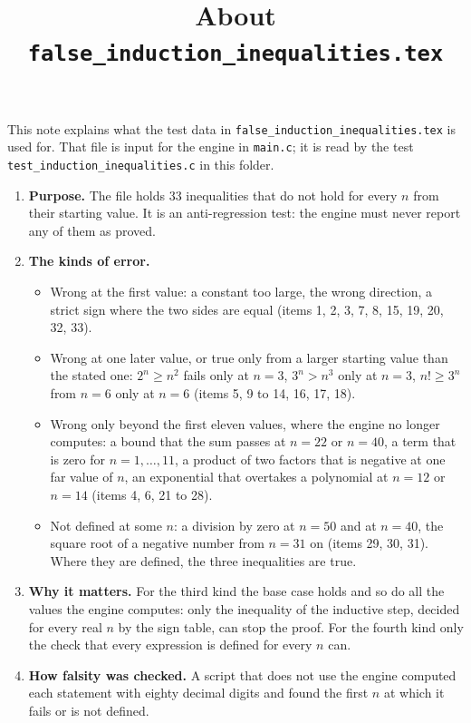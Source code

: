 \documentclass[11pt,a4paper]{article}
\title{About \texttt{false\_induction\_inequalities.tex}}
\author{}
\date{}
\begin{document}
\maketitle
This note explains what the test data in \texttt{false\_induction\_inequalities.tex} is used for. That file is input for the engine in \texttt{main.c}; it is read by the test \texttt{test\_induction\_inequalities.c} in this folder.

\begin{enumerate}
\item \textbf{Purpose.} The file holds 33 inequalities that do not hold for every $n$ from their starting value. It is an anti-regression test: the engine must never report any of them as proved.

\item \textbf{The kinds of error.}
\begin{itemize}
\item Wrong at the first value: a constant too large, the wrong direction, a strict sign where the two sides are equal (items 1, 2, 3, 7, 8, 15, 19, 20, 32, 33).
\item Wrong at one later value, or true only from a larger starting value than the stated one: $2^{n} \ge n^{2}$ fails only at $n = 3$, $3^{n} > n^{3}$ only at $n = 3$, $n! \ge 3^{n}$ from $n = 6$ only at $n = 6$ (items 5, 9 to 14, 16, 17, 18).
\item Wrong only beyond the first eleven values, where the engine no longer computes: a bound that the sum passes at $n = 22$ or $n = 40$, a term that is zero for $n = 1, \ldots, 11$, a product of two factors that is negative at one far value of $n$, an exponential that overtakes a polynomial at $n = 12$ or $n = 14$ (items 4, 6, 21 to 28).
\item Not defined at some $n$: a division by zero at $n = 50$ and at $n = 40$, the square root of a negative number from $n = 31$ on (items 29, 30, 31). Where they are defined, the three inequalities are true.
\end{itemize}

\item \textbf{Why it matters.} For the third kind the base case holds and so do all the values the engine computes: only the inequality of the inductive step, decided for every real $n$ by the sign table, can stop the proof. For the fourth kind only the check that every expression is defined for every $n$ can.

\item \textbf{How falsity was checked.} A script that does not use the engine computed each statement with eighty decimal digits and found the first $n$ at which it fails or is not defined.


\end{enumerate}
\end{document}
